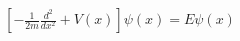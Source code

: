 \documentclass[10pt]{article}
\begin{document}
\begin{align*}\left[-\frac{1}{2m}\frac{d^2}{dx^2} + V(x) \right] \psi(x) = E\psi(x)\end{align*}
\end{document}

